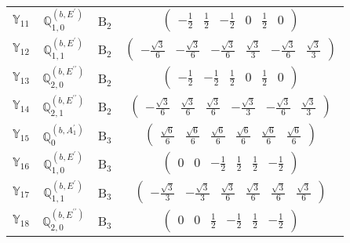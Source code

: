 \documentclass[fleqn,10pt,landscape]{article}
\begin{document}
\begin{itemize}
\begin{center}
\begin{longtable}{c|c|c|c}
$ \mathbb{Y}_{11} $ & $\mathbb{Q}_{1,0}^{(b,E^{\prime})}$ & B$_{2}$ & $\begin{pmatrix} - \frac{1}{2} & \frac{1}{2} & - \frac{1}{2} & 0 & \frac{1}{2} & 0 \end{pmatrix}$ \\
$ \mathbb{Y}_{12} $ & $\mathbb{Q}_{1,1}^{(b,E^{\prime})}$ & B$_{2}$ & $\begin{pmatrix} - \frac{\sqrt{3}}{6} & - \frac{\sqrt{3}}{6} & - \frac{\sqrt{3}}{6} & \frac{\sqrt{3}}{3} & - \frac{\sqrt{3}}{6} & \frac{\sqrt{3}}{3} \end{pmatrix}$ \\
$ \mathbb{Y}_{13} $ & $\mathbb{Q}_{2,0}^{(b,E^{\prime\prime})}$ & B$_{2}$ & $\begin{pmatrix} - \frac{1}{2} & - \frac{1}{2} & \frac{1}{2} & 0 & \frac{1}{2} & 0 \end{pmatrix}$ \\
$ \mathbb{Y}_{14} $ & $\mathbb{Q}_{2,1}^{(b,E^{\prime\prime})}$ & B$_{2}$ & $\begin{pmatrix} - \frac{\sqrt{3}}{6} & \frac{\sqrt{3}}{6} & \frac{\sqrt{3}}{6} & - \frac{\sqrt{3}}{3} & - \frac{\sqrt{3}}{6} & \frac{\sqrt{3}}{3} \end{pmatrix}$ \\ \hline
$ \mathbb{Y}_{15} $ & $\mathbb{Q}_{0}^{(b,A_{1}^{\prime})}$ & B$_{3}$ & $\begin{pmatrix} \frac{\sqrt{6}}{6} & \frac{\sqrt{6}}{6} & \frac{\sqrt{6}}{6} & \frac{\sqrt{6}}{6} & \frac{\sqrt{6}}{6} & \frac{\sqrt{6}}{6} \end{pmatrix}$ \\
$ \mathbb{Y}_{16} $ & $\mathbb{Q}_{1,0}^{(b,E^{\prime})}$ & B$_{3}$ & $\begin{pmatrix} 0 & 0 & - \frac{1}{2} & \frac{1}{2} & \frac{1}{2} & - \frac{1}{2} \end{pmatrix}$ \\
$ \mathbb{Y}_{17} $ & $\mathbb{Q}_{1,1}^{(b,E^{\prime})}$ & B$_{3}$ & $\begin{pmatrix} - \frac{\sqrt{3}}{3} & - \frac{\sqrt{3}}{3} & \frac{\sqrt{3}}{6} & \frac{\sqrt{3}}{6} & \frac{\sqrt{3}}{6} & \frac{\sqrt{3}}{6} \end{pmatrix}$ \\
$ \mathbb{Y}_{18} $ & $\mathbb{Q}_{2,0}^{(b,E^{\prime\prime})}$ & B$_{3}$ & $\begin{pmatrix} 0 & 0 & \frac{1}{2} & - \frac{1}{2} & \frac{1}{2} & - \frac{1}{2} \end{pmatrix}$ \\

\end{longtable}
\end{center}
\end{itemize}
\end{document}
